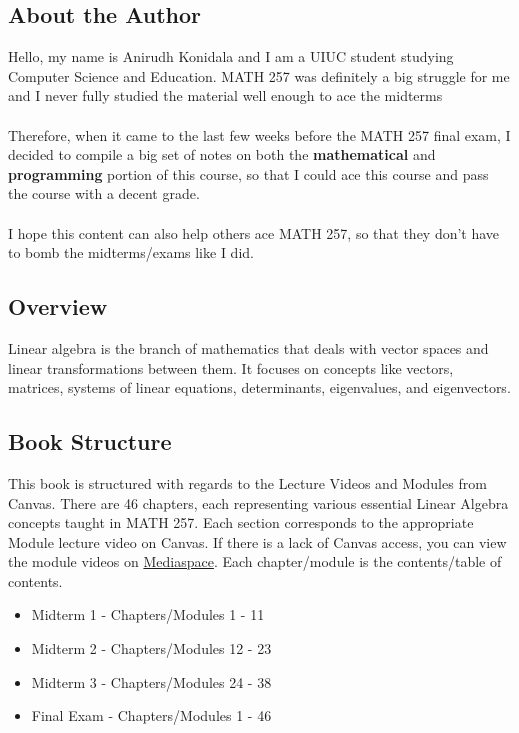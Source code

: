 \subsection{About the Author}
Hello, my name is Anirudh Konidala and I am a UIUC student studying Computer Science 
and Education. MATH 257 was definitely a big struggle for me and I never fully studied the material well enough to ace the midterms \\\\ 
Therefore, when it came to the last few weeks before the MATH 257 final exam, I decided to compile a big set of notes on both the \textbf{mathematical} 
and \textbf{programming} portion of this course, so that I could ace this course 
and pass the course with a decent grade. \\\\ 
I hope this content can also help others ace MATH 257, so that they don't 
have to bomb the midterms/exams like I did.

\subsection{Overview}
Linear algebra is the branch of mathematics that deals with vector spaces and linear transformations between them. It focuses on concepts like vectors, matrices, systems of linear equations, determinants, eigenvalues, and eigenvectors.

\subsection{Book Structure}
This book is structured with regards to the Lecture Videos and Modules from Canvas. 
There are 46 chapters, each representing various essential Linear Algebra concepts 
taught in MATH 257. Each section corresponds to the appropriate Module lecture video 
on Canvas. 
If there is a lack of Canvas access, you can view the module videos on \href{https://mediaspace.illinois.edu/playlist/dedicated/1_sbehz0wr/1_nkdnuuw8}{Mediaspace}. Each chapter/module is the contents/table of contents. 
\begin{itemize}
\item Midterm 1 - Chapters/Modules 1 - 11
\item Midterm 2 - Chapters/Modules 12 - 23
\item Midterm 3 - Chapters/Modules 24 - 38
\item Final Exam - Chapters/Modules 1 - 46
\end{itemize}
\newpage
\tableofcontents
\newpage
